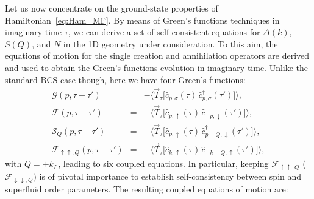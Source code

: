 \documentclass[pra,aps,superscriptaddress,twocolumn]{revtex4}
\begin{document}
Let us now concentrate on the ground-state properties of Hamiltonian~\eqref{eq:Ham_MF}.
By means of Green's functions techniques in imaginary time $\tau$, we can derive a set of self-consistent
equations for $\Delta(k)$, $S(Q)$, and $N$ in the 1D geometry under consideration. To this aim, the equations of motion
for the single creation and annihilation operators are derived and used to obtain the Green's functions evolution in imaginary time.
Unlike the standard BCS case though, here we have four Green's functions:
\begin{eqnarray}
\mathcal{G}(p, \tau-\tau') & = & - \big\langle \vec T_\tau \big[ \hat c_{p,\sigma}(\tau)\, \hat c^\dagger_{p,\sigma}(\tau') \big] \big\rangle, \\
  \mathcal{F}(p, \tau-\tau') & = & -\big\langle \vec T_\tau \big[ \hat c_{p,\uparrow}(\tau) \, \hat c_{-p,\downarrow}(\tau') \big] \big\rangle, \\
  \mathcal{S}_Q (p, \tau-\tau') & = & - \big\langle \vec T_\tau \big[ \hat c_{p,\uparrow}(\tau) \, \hat c^\dagger_{p+Q,\downarrow}(\tau') \big] \big\rangle, \\
  \mathcal{F}_{\uparrow\uparrow,Q}(p, \tau-\tau') & = & - \big\langle \vec T_\tau \big[ \hat c_{k,\uparrow}(\tau) \, \hat c_{-k-Q,\uparrow}(\tau') \big] \big\rangle,
\end{eqnarray}
with $Q=\pm k_L$, leading to six coupled equations.
In particular, keeping $\mathcal{F}_{\uparrow\uparrow,Q}$ ($\mathcal{F}_{\downarrow\downarrow,Q}$) is of pivotal importance to establish
self-consistency between spin and superfluid order parameters. The resulting coupled equations of motion are:
\end{document}
